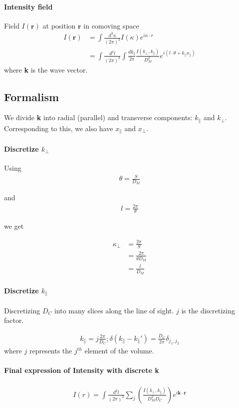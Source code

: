 \documentclass[12pt]{article}
\newcommand{\beq}{\begin{equation}}
\newcommand{\eeq}{\end{equation}}
\newcommand{\beqa}{\begin{eqnarray}}
\newcommand{\eeqa}{\end{eqnarray}}
\newcommand{\beqal}{\begin{aligned}}
\newcommand{\eeqal}{\end{aligned}}
\numberwithin{equation}{section}
\begin{document}
\paragraph{Intensity field}
Field $ I(\textbf{r}) $ at position $ \textbf{r} $ in comoving space
\beq
\beqal
I(\textbf{r}) &= \int \frac{d^3\kappa}{(2\pi)^3} I(\kappa) e^{i \kappa \cdot r}
\\
&= \int \frac{d^2l}{(2\pi)^2} \int \frac{dk_{\parallel}}{2\pi} \frac{I(k_\perp, k_\parallel)}{D_M^2} e^{i(l\cdot \theta + k_\parallel x_\parallel)}
\eeqal
\eeq
where \textbf{k} is the wave vector.

\subsection{Formalism}
We divide \textbf{k} into radial (parallel) and transverse components: $ k_\parallel $ and $ k_\perp $. Corresponding to this, we also have $ x_\parallel $ and $ x_\perp $.

\paragraph{Discretize $k_\perp$} Using
\beqa
\theta = \frac{S}{D_M}
\eeqa

and 
\beqa
l = \frac{2 \pi}{\theta}
\eeqa

we get 

\beq
\beqal
\kappa_\perp &= \frac{2 \pi}{S}
\\
&= \frac{2 \pi }{\theta D_M}
\\
&= \frac{l}{D_M}
\eeqal
\eeq

\paragraph{Discretize $ k_\parallel $}Discretizing $ D_C $ into many slices along the line of sight. $ j $ is the discretizing factor.

\beqa
k_\parallel  = j\frac{2\pi}{D_C}; \delta(k_\parallel - k_\parallel') = \frac{D_C}{2\pi} \delta_{j_1, j_2} 
\eeqa
where $ j $ represents the $ j^{th} $ element of the volume.

\paragraph{Final expression of Intensity with discrete \textbf{k}}
\beqa
I(r) = \int\frac{d^2l}{(2\pi)^2} \sum_j \left(\frac{I(k_\perp, k_\parallel)}{D_M^2 D_C} \right) e^{i \textbf{k} \cdot \textbf{r}}
\eeqa
\end{document}
